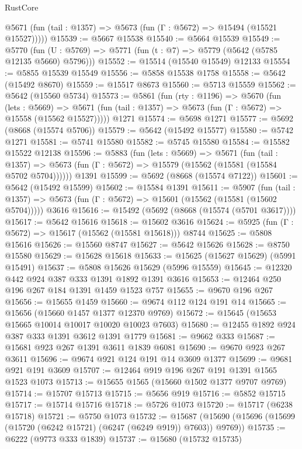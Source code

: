 \begin{lexlean}{RustCore}
\begin{coremodule}
      @5671 (fun (tail : @1357) => @5673 (fun (Γ : @5672) => @15494 (@15521 @15527)))))
@15539 := @5667 @15538
@15540 := @5664 @15539
@15549 := @5770
    (fun (U : @5769) => @5771 (fun (t : @7) => @5779 (@5642 (@5785 @12135 @5660) @5796)))
@15552 := @15514 (@15540 @15549) @12133
@15554 := @5855 @15539 @15549
@15556 := @5858 @15538 @1758
@15558 := @5642 (@15492 @8670)
@15559 := @15517 @8673
@15560 := @5713 @15559
@15562 := @5642 (@15560 @5734)
@15573 := @5861
    (fun (rty : @1196) =>
    @5670
      (fun (lets : @5669) =>
      @5671 (fun (tail : @1357) => @5673 (fun (Γ : @5672) => @15558 (@15562 @15527)))))
    @1271
@15574 := @5698 @1271
@15577 := @5692 (@8668 (@15574 @5706))
@15579 := @5642 (@15492 @15577)
@15580 := @5742 @1271
@15581 := @5741 @15580
@15582 := @5745 @15580
@15584 := @15582 @15522 @12138
@15596 := @5883
    (fun (lets : @5669) =>
    @5671
      (fun (tail : @1357) =>
      @5673 (fun (Γ : @5672) => @15579 (@15562 (@15581 (@15584 @5702 @5704))))))
    @1391
@15599 := @5692 (@8668 (@15574 @7122))
@15601 := @5642 (@15492 @15599)
@15602 := @15584 @1391
@15611 := @5907
    (fun (tail : @1357) => @5673 (fun (Γ : @5672) => @15601 (@15562 (@15581 (@15602 @5704)))))
    @3616
@15616 := @15492 (@5692 (@8668 (@15574 (@5701 @3617))))
@15617 := @5642 @15616
@15618 := @15602 @3616
@15624 := @5925 (fun (Γ : @5672) => @15617 (@15562 (@15581 @15618))) @8744
@15625 := @5808 @15616
@15626 := @15560 @8747
@15627 := @5642 @15626
@15628 := @8750 @15580
@15629 := @15628 @15618
@15633 := @15625 (@15627 @15629) (@5991 @15491)
@15637 := @5808 @15626 @15629 (@5996 @15559)
@15645 := @12320 @442 @924 @387 @333 @1391 @1892 @1391 @3616
@15653 := @12464 @250 @196 @267 @184 @1391 @1459 @1523 @757
@15655 := @9670 @196 @267
@15656 := @15655 @1459
@15660 := @9674 @112 @124 @191 @14
@15665 := @15656 (@15660 @1457 @1377 @12370 @9769)
@15672 := @15645 (@15653 @15665 @10014 @10017 @10020 @10023 @7603)
@15680 := @12455 @1892 @924 @387 @333 @1391 @3612 @1391 @1779
@15681 := @9662 @333
@15687 := @15681 @923 @267 @1391 @3611 @1839 @6081
@15690 := @9670 @923 @267 @3611
@15696 := @9674 @921 @124 @191 @14 @3609 @1377
@15699 := @9681 @921 @191 @3609
@15707 := @12464 @919 @196 @267 @191 @1391 @1565 @1523 @1073
@15713 := @15655 @1565 (@15660 @1502 @1377 @9707 @9769)
@15714 := @15707 @15713
@15715 := @5656 @919
@15716 := @5852 @15715
@15717 := @15714 @15716
@15718 := @5726 @1073
@15720 := @15717 (@6238 @15718)
@15721 := @5750 @1073
@15732 := @15687 (@15690 (@15696 (@15699 (@15720 (@6242 @15721) (@6247 (@6249 @919)) @7603)) @9769))
@15735 := @6222 (@9773 @333 @1839)
@15737 := @15680 (@15732 @15735)

\end{coremodule}
\end{lexlean}
